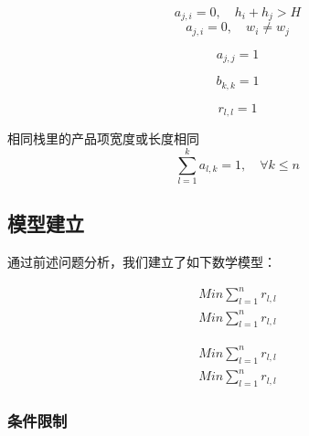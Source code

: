 \documentclass[bwprint]{gmcmthesis}
\begin{document}
\begin{equation}
    a_{j,i}=0, \quad   h_{i}+h_{j}>H
\end{equation}
\begin{equation}
    a_{j,i}=0, \quad  w_{i} \ne w_{j}
\end{equation}


\begin{equation}
    a_{j,j}=1
\end{equation}


\begin{equation}
    b_{k,k}=1
\end{equation}

\begin{equation}
    r_{l,l}=1
\end{equation}












相同栈里的产品项宽度或长度相同
\begin{equation}
    \sum_{l=1}^{k} a_{l,k}=1,\quad \forall k\leqslant n
\end{equation}  

\subsection{模型建立}
通过前述问题分析，我们建立了如下数学模型：




\begin{equation}
    \begin{aligned}
    Min \sum_{l=1}^{n} r_{l,l}\\
    Min \sum_{l=1}^{n} r_{l,l}
    \end{aligned}
\end{equation}  





\begin{equation}
    \begin{aligned}
    Min \sum_{l=1}^{n} r_{l,l}\\
    Min \sum_{l=1}^{n} r_{l,l}
    \end{aligned}
\end{equation}  




\subsubsection{条件限制}
\end{document}
